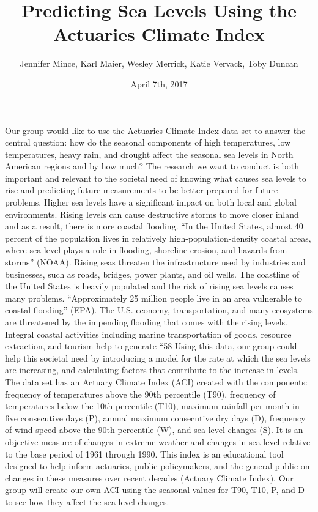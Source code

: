 \documentclass[letterpaper]{report}
\title{Predicting Sea Levels Using the Actuaries Climate Index}
\date{April 7th, 2017}
\author{Jennifer Mince, Karl Maier, Wesley Merrick, Katie Vervack, Toby Duncan}
\begin{document}
	\maketitle

		Our group would like to use the Actuaries Climate Index data set to answer the central question: how do the seasonal components of high temperatures, low temperatures, heavy rain, and drought affect the seasonal sea levels in North American regions and by how much?
		The research we want to conduct is both important and relevant to the societal need of knowing what causes sea levels to rise and predicting future measurements to be better prepared for future problems. Higher sea levels have a significant impact on both local and global environments. Rising levels can cause destructive storms to move closer inland and as a result, there is more coastal flooding. “In the United States, almost 40 percent of the population lives in relatively high-population-density coastal areas, where sea level plays a role in flooding, shoreline erosion, and hazards from storms” (NOAA). Rising seas threaten the infrastructure used by industries and businesses, such as roads, bridges, power plants, and oil wells. The coastline of the United States is heavily populated and the risk of rising sea levels causes many problems.  “Approximately 25 million people live in an area vulnerable to coastal flooding” (EPA). The U.S. economy, transportation, and many ecosystems are threatened by the impending flooding that comes with the rising levels. Integral coastal activities including marine transportation of goods, resource extraction, and tourism help to generate “58%
		Using this data, our group could help this societal need by introducing a model for the rate at which the sea levels are increasing, and calculating factors that contribute to the increase in levels. The data set has an Actuary Climate Index (ACI) created with the components: frequency of temperatures above the 90th percentile (T90), frequency of temperatures below the 10th percentile (T10), maximum rainfall per month in five consecutive days (P), annual maximum consecutive dry days (D), frequency of wind speed above the 90th percentile (W), and sea level changes (S). It is an objective measure of changes in extreme weather and changes in sea level relative to the base period of 1961 through 1990. This index is an educational tool designed to help inform actuaries, public policymakers, and the general public on changes in these measures over recent decades (Actuary Climate Index). Our group will create our own ACI using the seasonal values for T90, T10, P, and D to see how they affect the sea level changes. 
\end{document}
